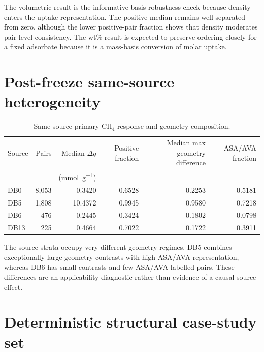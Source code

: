 The volumetric result is the informative basis-robustness check because density
enters the uptake representation. The positive median remains well separated from
zero, although the lower positive-pair fraction shows that density moderates
pair-level consistency. The wt\% result is expected to preserve ordering closely
for a fixed adsorbate because it is a mass-basis conversion of molar uptake.

\section{Post-freeze same-source heterogeneity}

\begin{table}[H]
\centering
\caption{Same-source primary CH$_4$ response and geometry composition.}
\label{tab:S28}
\begin{tabular}{lrrrrr}
\toprule
Source & Pairs & Median $\Delta q$ & Positive fraction & Median max geometry difference & ASA/AVA fraction \\
 & & (\si{\milli\mole\per\gram}) & & & \\
\midrule
DB0 & 8,053 & 0.3420 & 0.6528 & 0.2253 & 0.5181 \\
DB5 & 1,808 & 10.4372 & 0.9945 & 0.9580 & 0.7218 \\
DB6 & 476 & -0.2445 & 0.3424 & 0.1802 & 0.0798 \\
DB13 & 225 & 0.4664 & 0.7022 & 0.1722 & 0.3911 \\
\bottomrule
\end{tabular}
\end{table}

The source strata occupy very different geometry regimes. DB5 combines exceptionally
large geometry contrasts with high ASA/AVA representation, whereas DB6 has small
contrasts and few ASA/AVA-labelled pairs. These differences are an applicability
diagnostic rather than evidence of a causal source effect.

\section{Deterministic structural case-study set}

